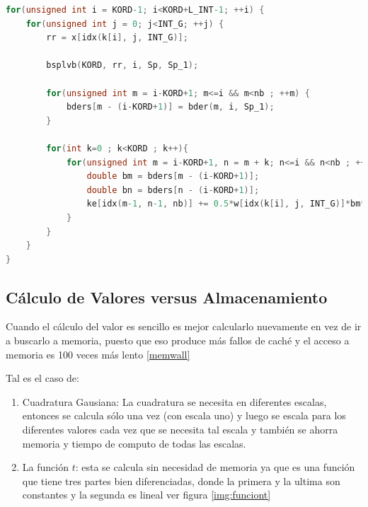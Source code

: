 \documentclass[a4paper,openright,12pt, oneside]{book}
\begin{document}
\begin{lstlisting}[language=C, caption={Despu\'es de la factorizaci\'on calculo matrices}, 
label=cod:after]
for(unsigned int i = KORD-1; i<KORD+L_INT-1; ++i) {
    for(unsigned int j = 0; j<INT_G; ++j) {
        rr = x[idx(k[i], j, INT_G)];

        bsplvb(KORD, rr, i, Sp, Sp_1);

        for(unsigned int m = i-KORD+1; m<=i && m<nb ; ++m) {
            bders[m - (i-KORD+1)] = bder(m, i, Sp_1);
        }

        for(int k=0 ; k<KORD ; k++){
            for(unsigned int m = i-KORD+1, n = m + k; n<=i && n<nb ; ++m, ++n) {
                double bm = bders[m - (i-KORD+1)];
                double bn = bders[n - (i-KORD+1)];
                ke[idx(m-1, n-1, nb)] += 0.5*w[idx(k[i], j, INT_G)]*bm*bn/ME;
            }
        }
    }
}
\end{lstlisting}

\subsection{C\'alculo de Valores versus Almacenamiento}
Cuando el c\'alculo del valor es sencillo es mejor calcularlo nuevamente en vez de ir a buscarlo a memoria, puesto que eso produce m\'as fallos de cach\'e y el acceso a memoria es 100 veces m\'as lento \ref{memwall}

Tal es el caso de:
\begin{enumerate}
    \item Cuadratura Gausiana: La cuadratura se necesita en diferentes escalas, entonces se calcula s\'olo una vez (con escala uno) y luego se escala para los diferentes valores cada vez que se necesita tal escala y tambi\'en se ahorra memoria y tiempo de computo de todas las escalas.
    \item La funci\'on $t$: esta se calcula sin necesidad de memoria ya que es una funci\'on que tiene tres partes bien diferenciadas, donde la primera y la ultima son constantes y la segunda es lineal ver figura \ref{img:funciont}
\end{enumerate}
\end{document}
